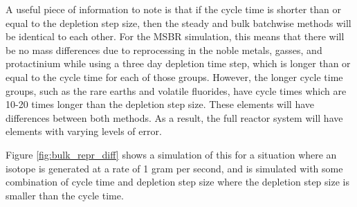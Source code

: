 

A useful piece of information to note is that if the cycle time is shorter than or equal to the depletion step size, then the steady and bulk batchwise methods will be identical to each other.
For the MSBR simulation, this means that there will be no mass differences due to reprocessing in the noble metals, gasses, and protactinium while using a three day depletion time step, which is longer than or equal to the cycle time for each of those groups. %
However, the longer cycle time groups, such as the rare earths and volatile fluorides, have cycle times which are 10-20 times longer than the depletion step size. These elements will have differences between both methods. As a result, the full reactor system will have elements with varying levels of error.

Figure \ref{fig:bulk_repr_diff} shows a simulation of this for a situation where an isotope is generated at a rate of 1 gram per second, and is simulated with some combination of cycle time and depletion step size where the depletion step size is smaller than the cycle time.

